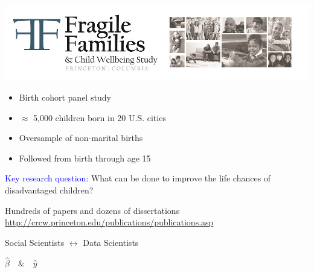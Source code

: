 \documentclass{beamer}
\begin{document}
\begin{frame}

\begin{center}
\includegraphics[width=\textwidth]{figures/ff_logo}
\end{center}

\begin{itemize}
\item Birth cohort panel study
\item $\approx$ 5,000 children born in 20 U.S. cities
\item Oversample of non-marital births 
\item Followed from birth through age 15
\end{itemize}

\textcolor{blue}{Key research question}: What can be done to improve the life chances of disadvantaged children?

\end{frame}
\begin{frame}

Hundreds of papers and dozens of dissertations \vskip 1cm
\scriptsize \url{http://crcw.princeton.edu/publications/publications.asp}

\end{frame}
\begin{frame}

\begin{center}
\large{Social Scientists $\longleftrightarrow$ Data Scientists}
\end{center}
\pause
\begin{center}
\LARGE{
$\hat{\beta} \quad \& \quad \hat{y}$
}
\end{center}

\end{frame}
\end{document}
